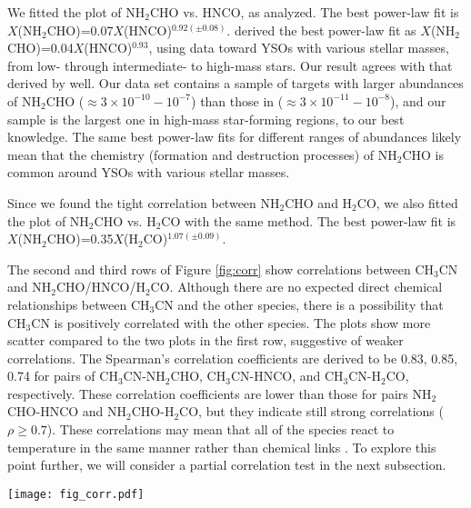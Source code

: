\documentclass[twocolumn, twocolappendix]{aastex631}
\begin{document}
We fitted the plot of NH$_{2}$CHO vs. HNCO, as \citet{2015MNRAS.449.2438L} analyzed.
The best power-law fit is $X$(NH$_{2}$CHO)=0.07$X$(HNCO)$^{0.92(\pm0.08)}$.
\citet{2015MNRAS.449.2438L} derived the best power-law fit as $X$(NH$_{2}$CHO)=0.04$X$(HNCO)$^{0.93}$, using data toward YSOs with various stellar masses, from low- through intermediate- to high-mass stars.
Our result agrees with that derived by \citet{2015MNRAS.449.2438L} well.
Our data set contains a sample of targets with larger abundances of NH$_{2}$CHO ($\approx3\times10^{-10}-10^{-7}$) than those in \citet{2015MNRAS.449.2438L} ($\approx3\times10^{-11}-10^{-8}$), and our sample is the largest one in high-mass star-forming regions, to our best knowledge.
The same best power-law fits for different ranges of abundances likely mean that the chemistry (formation and destruction processes) of NH$_{2}$CHO is common around YSOs with various stellar masses.

Since we found the tight correlation between NH$_{2}$CHO and H$_{2}$CO, we also fitted the plot of NH$_{2}$CHO vs. H$_{2}$CO with the same method.
The best power-law fit is $X$(NH$_{2}$CHO)=0.35$X$(H$_{2}$CO)$^{1.07(\pm0.09)}$.

The second and third rows of Figure \ref{fig:corr} show correlations between CH$_{3}$CN and NH$_{2}$CHO/HNCO/H$_{2}$CO.
Although there are no expected direct chemical relationships between CH$_{3}$CN and the other species, there is a possibility that CH$_{3}$CN is positively correlated with the other species.
The plots show more scatter compared to the two plots in the first row, suggestive of weaker correlations. 
The Spearman's correlation coefficients are derived to be 0.83, 0.85, 0.74 for pairs of CH$_{3}$CN-NH$_{2}$CHO, CH$_{3}$CN-HNCO, and CH$_{3}$CN-H$_{2}$CO, respectively.
These correlation coefficients are lower than those for pairs NH$_{2}$CHO-HNCO and NH$_{2}$CHO-H$_{2}$CO, but they indicate still strong correlations ($\rho \geq 0.7$).
These correlations may mean that all of the species react to temperature in the same manner rather than chemical links \citep{2018MNRAS.474.2796Q}.
To explore this point further, we will consider a partial correlation test in the next subsection.

\begin{figure*}[th]
 \begin{center}
  \texttt{[image: fig\_corr.pdf]}
 \end{center}
\caption{Relationships of molecular abundances. The red lines in the top two panels show the result of the best power-law fit. \label{fig:corr}}
\end{figure*}
\end{document}
